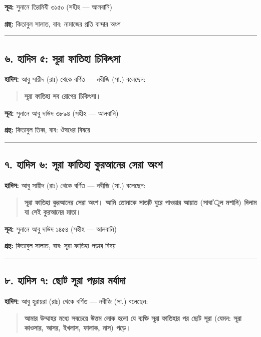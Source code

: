 \textbf{সূত্র:} সুনানে তিরমিযী ৩১৫০ (সহীহ — আলবানি)

\textbf{গ্রন্থ:} কিতাবুল সালাত, বাব: নামাজের প্রতি বান্দার অংশ

\medskip\hrule\medskip

\subsection*{৬. হাদিস ৫: সূরা ফাতিহা চিকিৎসা}

\textbf{হাদিস:} আবু সায়ীদ (রাঃ) থেকে বর্ণিত — নবীজি (সা.) বলেছেন:

\begin{quote}
\textbf{সূরা ফাতিহা সব রোগের চিকিৎসা।}
\end{quote}

\textbf{সূত্র:} সুনানে আবু দাউদ ৩৮৯৪ (সহীহ — আলবানি)

\textbf{গ্রন্থ:} কিতাবুল তিব্ব, বাব: ঔষধের বিষয়ে

\medskip\hrule\medskip

\subsection*{৭. হাদিস ৬: সূরা ফাতিহা কুরআনের সেরা অংশ}

\textbf{হাদিস:} আবু সায়ীদ (রাঃ) থেকে বর্ণিত — নবীজি (সা.) বলেছেন:

\begin{quote}
\textbf{সূরা ফাতিহা কুরআনের সেরা অংশ। আমি তোমাকে সাতটি ঘুরে পাওয়ার আয়াত (সাবা'ুল মশানি) দিলাম যা সেই কুরআনের মাতা।}
\end{quote}

\textbf{সূত্র:} সুনানে আবু দাউদ ১৪৫৪ (সহীহ — আলবানি)

\textbf{গ্রন্থ:} কিতাবুল সালাত, বাব: সূরা ফাতিহা পড়ার বিষয়

\medskip\hrule\medskip

\subsection*{৮. হাদিস ৭: ছোট সূরা পড়ার মর্যাদা}

\textbf{হাদিস:} আবু হুরায়রা (রাঃ) থেকে বর্ণিত — নবীজি (সা.) বলেছেন:

\begin{quote}
\textbf{আমার উম্মাহর মধ্যে সবচেয়ে উত্তম লোক হলো যে ব্যক্তি সূরা ফাতিহার পর ছোট সূরা (যেমন: সূরা কাওসার, আসর, ইখলাস, ফালাক, নাস) পড়ে।}
\end{quote}

